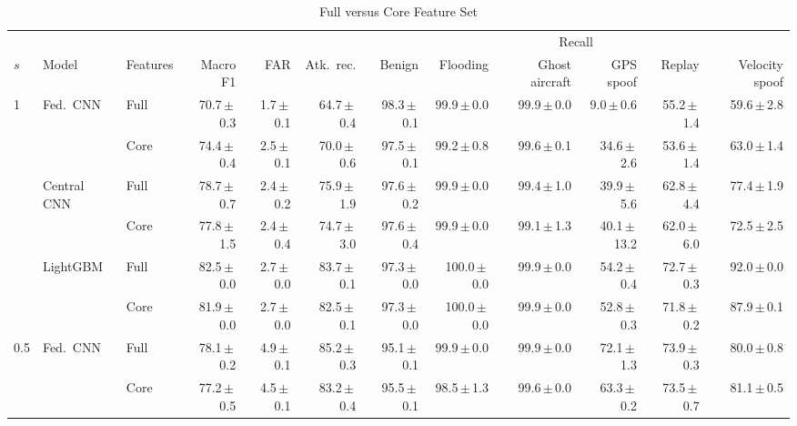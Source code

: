 \begin{table}[t]
\centering
\scriptsize
\caption{Full versus Core Feature Set}
\label{tab:ablation}
\setlength{\tabcolsep}{2pt}
\begin{tabular}{lllrrrrrrrrr}
\toprule
& & & & & & \multicolumn{6}{c}{Recall} \\ \cmidrule(lr){7-12}
$s$ & Model & Features & Macro F1 & FAR & Atk.\ rec. & Benign & Flooding & Ghost aircraft & GPS spoof & Replay & Velocity spoof \\
\midrule
1 & Fed.\ CNN & Full & 70.7{\,}$\pm${\,}0.3 & 1.7{\,}$\pm${\,}0.1 & 64.7{\,}$\pm${\,}0.4 & 98.3{\,}$\pm${\,}0.1 & 99.9{\,}$\pm${\,}0.0 & 99.9{\,}$\pm${\,}0.0 & 9.0{\,}$\pm${\,}0.6 & 55.2{\,}$\pm${\,}1.4 & 59.6{\,}$\pm${\,}2.8 \\
 &  & Core & 74.4{\,}$\pm${\,}0.4 & 2.5{\,}$\pm${\,}0.1 & 70.0{\,}$\pm${\,}0.6 & 97.5{\,}$\pm${\,}0.1 & 99.2{\,}$\pm${\,}0.8 & 99.6{\,}$\pm${\,}0.1 & 34.6{\,}$\pm${\,}2.6 & 53.6{\,}$\pm${\,}1.4 & 63.0{\,}$\pm${\,}1.4 \\
 & Central CNN & Full & 78.7{\,}$\pm${\,}0.7 & 2.4{\,}$\pm${\,}0.2 & 75.9{\,}$\pm${\,}1.9 & 97.6{\,}$\pm${\,}0.2 & 99.9{\,}$\pm${\,}0.0 & 99.4{\,}$\pm${\,}1.0 & 39.9{\,}$\pm${\,}5.6 & 62.8{\,}$\pm${\,}4.4 & 77.4{\,}$\pm${\,}1.9 \\
 &  & Core & 77.8{\,}$\pm${\,}1.5 & 2.4{\,}$\pm${\,}0.4 & 74.7{\,}$\pm${\,}3.0 & 97.6{\,}$\pm${\,}0.4 & 99.9{\,}$\pm${\,}0.0 & 99.1{\,}$\pm${\,}1.3 & 40.1{\,}$\pm${\,}13.2 & 62.0{\,}$\pm${\,}6.0 & 72.5{\,}$\pm${\,}2.5 \\
 & LightGBM & Full & 82.5{\,}$\pm${\,}0.0 & 2.7{\,}$\pm${\,}0.0 & 83.7{\,}$\pm${\,}0.1 & 97.3{\,}$\pm${\,}0.0 & 100.0{\,}$\pm${\,}0.0 & 99.9{\,}$\pm${\,}0.0 & 54.2{\,}$\pm${\,}0.4 & 72.7{\,}$\pm${\,}0.3 & 92.0{\,}$\pm${\,}0.0 \\
 &  & Core & 81.9{\,}$\pm${\,}0.0 & 2.7{\,}$\pm${\,}0.0 & 82.5{\,}$\pm${\,}0.1 & 97.3{\,}$\pm${\,}0.0 & 100.0{\,}$\pm${\,}0.0 & 99.9{\,}$\pm${\,}0.0 & 52.8{\,}$\pm${\,}0.3 & 71.8{\,}$\pm${\,}0.2 & 87.9{\,}$\pm${\,}0.1 \\
\midrule
0.5 & Fed.\ CNN & Full & 78.1{\,}$\pm${\,}0.2 & 4.9{\,}$\pm${\,}0.1 & 85.2{\,}$\pm${\,}0.3 & 95.1{\,}$\pm${\,}0.1 & 99.9{\,}$\pm${\,}0.0 & 99.9{\,}$\pm${\,}0.0 & 72.1{\,}$\pm${\,}1.3 & 73.9{\,}$\pm${\,}0.3 & 80.0{\,}$\pm${\,}0.8 \\
 &  & Core & 77.2{\,}$\pm${\,}0.5 & 4.5{\,}$\pm${\,}0.1 & 83.2{\,}$\pm${\,}0.4 & 95.5{\,}$\pm${\,}0.1 & 98.5{\,}$\pm${\,}1.3 & 99.6{\,}$\pm${\,}0.0 & 63.3{\,}$\pm${\,}0.2 & 73.5{\,}$\pm${\,}0.7 & 81.1{\,}$\pm${\,}0.5 \\

\end{tabular}
\end{table}
